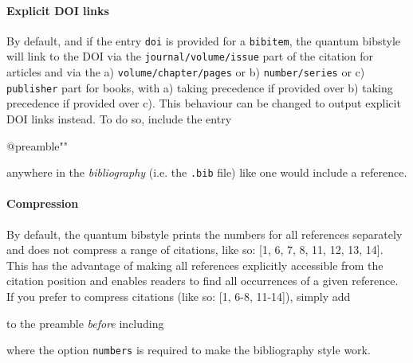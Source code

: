 \documentclass[a4paper,twocolumn,11pt]{quantumarticle}
\begin{document}
\paragraph{Explicit DOI links}
By default, and if the entry \texttt{doi} is provided for a \texttt{bibitem}, the quantum bibstyle will link to the DOI via the \texttt{journal/volume/issue} part of the citation for articles and via the a) \texttt{volume/chapter/pages} or b) \texttt{number/series} or c) \texttt{publisher} part for books, with a) taking precedence if provided over b) taking precedence if provided over c).
This behaviour can be changed to output explicit DOI links instead. To do so, include the entry
\begin{verbatim*}
@preamble{"\MakeDoiLinksExplicit"}
\end{verbatim*}
anywhere in the \emph{bibliography} (i.e. the \texttt{.bib} file) like one would include a reference.

\paragraph{Compression}
By default, the quantum bibstyle prints the numbers for all references separately and does not compress
a range of citations, like so: [1, 6, 7, 8, 11, 12, 13, 14].
This has the advantage of making all references explicitly accessible from the citation position and enables readers to find all occurrences of a given reference.
If you prefer to compress citations (like so: [1, 6-8, 11-14]), simply add
\begin{verbatim*}
\end{verbatim*}
to the preamble \emph{before} including
\begin{verbatim*}
\usepackage[numbers]{natbib}
\end{verbatim*}
where the option \texttt{numbers} is required to make the bibliography style work.

\iffalse
\section{Tests}\label{sec:tests}

Directly from the arxiv~\citetests{mendez2021dissipation}, arxiv via Zotero~\citetests{mendez2021dissipation_2}, some more testcases~\citetests{holevo2012quantum,Holevo_2012,akers2020simple,katariya2021geometric,katariya2021geometric_2,jain2010guaranteed}

Andrea's test case: \citetests{andreas_test_case}.

\bibliographystyletests{quantum}
\bibliographytests{quantum_bst_demo}
\fi
	
\end{document}
